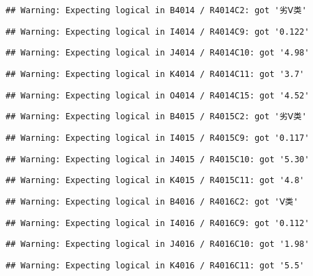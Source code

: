 \documentclass[
]{article}
\begin{document}
\begin{verbatim}
## Warning: Expecting logical in B4014 / R4014C2: got '劣Ⅴ类'
\end{verbatim}

\begin{verbatim}
## Warning: Expecting logical in I4014 / R4014C9: got '0.122'
\end{verbatim}

\begin{verbatim}
## Warning: Expecting logical in J4014 / R4014C10: got '4.98'
\end{verbatim}

\begin{verbatim}
## Warning: Expecting logical in K4014 / R4014C11: got '3.7'
\end{verbatim}

\begin{verbatim}
## Warning: Expecting logical in O4014 / R4014C15: got '4.52'
\end{verbatim}

\begin{verbatim}
## Warning: Expecting logical in B4015 / R4015C2: got '劣Ⅴ类'
\end{verbatim}

\begin{verbatim}
## Warning: Expecting logical in I4015 / R4015C9: got '0.117'
\end{verbatim}

\begin{verbatim}
## Warning: Expecting logical in J4015 / R4015C10: got '5.30'
\end{verbatim}

\begin{verbatim}
## Warning: Expecting logical in K4015 / R4015C11: got '4.8'
\end{verbatim}

\begin{verbatim}
## Warning: Expecting logical in B4016 / R4016C2: got 'Ⅴ类'
\end{verbatim}

\begin{verbatim}
## Warning: Expecting logical in I4016 / R4016C9: got '0.112'
\end{verbatim}

\begin{verbatim}
## Warning: Expecting logical in J4016 / R4016C10: got '1.98'
\end{verbatim}

\begin{verbatim}
## Warning: Expecting logical in K4016 / R4016C11: got '5.5'
\end{verbatim}
\end{document}

